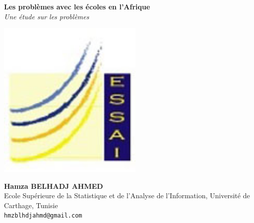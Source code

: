 \documentclass[a0, portrait]{a0poster}
\begin{document}


\begin{minipage}[b]{0.75\linewidth}
\VeryHuge \color{NavyBlue} \textbf{Les problèmes avec les écoles en l'Afrique} \color{Black}\\[0.5cm]%
\Huge\textit{Une étude sur les problèmes }\\[0.5cm]%
\end{minipage}
%
\begin{minipage}[b]{0.25\linewidth}
\includegraphics[width=7cm]{logo-essai.jpg}
\end{minipage}

\begin{minipage}[b]{0.75\linewidth}
\huge \textbf{Hamza BELHADJ AHMED}\\[0.5cm] %
\Large Ecole Sup\'erieure de la Statistique et de l'Analyse de l'Information, Université de Carthage, Tunisie\\[0.4cm] %
\large \texttt{hmzblhdjahmd@gmail.com}\\
\end{minipage}


\vspace{1cm} %
\end{document}
